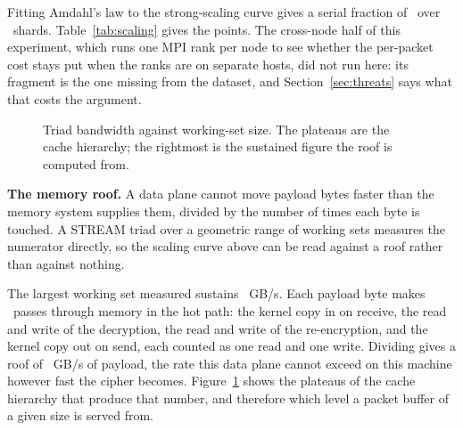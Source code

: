 Fitting Amdahl's law to the strong-scaling curve gives a serial fraction of
\scaleSerialFraction\ over \scaleMaxShards\ shards. Table~\ref{tab:scaling}
gives the points. The cross-node half of this experiment, which runs one MPI
rank per node to see whether the per-packet cost stays put when the ranks are on
separate hosts, did not run here: its fragment is the one missing from the
dataset, and Section~\ref{sec:threats} says what that costs the argument.

\begin{table}[t]
\caption{Scaling of the shard pool.}
\label{tab:scaling}
\centering\footnotesize

\end{table}

\begin{figure}[t]
\centering
{}
\caption{Triad bandwidth against working-set size. The plateaus are the cache
hierarchy; the rightmost is the sustained figure the roof is computed from.}
\label{fig:memroof}
\end{figure}

\noindent\textbf{The memory roof.}
A data plane cannot move payload bytes faster than the memory system supplies
them, divided by the number of times each byte is touched. A STREAM triad
\cite{mccalpin1995} over a geometric range of working sets measures the
numerator directly, so the scaling curve above can be read against a roof
\cite{williams2009} rather than against nothing.

The largest working set measured sustains \memSustainedGBps\ GB/s. Each payload
byte makes \memPasses\ passes through memory in the hot path: the kernel copy in
on receive, the read and write of the decryption, the read and write of the
re-encryption, and the kernel copy out on send, each counted as one read and one
write. Dividing gives a roof of \memRoofGBps\ GB/s of payload, the rate this
data plane cannot exceed on this machine however fast the cipher becomes.
Figure~\ref{fig:memroof} shows the plateaus of the cache hierarchy that produce
that number, and therefore which level a packet buffer of a given size is served
from.
